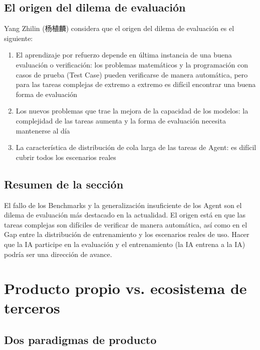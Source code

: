 \documentclass[a4paper]{article}
\begin{document}
\subsection{El origen del dilema de evaluación}

Yang Zhilin (杨植麟) considera que el origen del dilema de evaluación es el siguiente:

\begin{enumerate}
    \item El aprendizaje por refuerzo depende en última instancia de una buena evaluación o verificación: los problemas matemáticos y la programación con casos de prueba (Test Case) pueden verificarse de manera automática, pero para las tareas complejas de extremo a extremo es difícil encontrar una buena forma de evaluación
    \item Los nuevos problemas que trae la mejora de la capacidad de los modelos: la complejidad de las tareas aumenta y la forma de evaluación necesita mantenerse al día
    \item La característica de distribución de cola larga de las tareas de Agent: es difícil cubrir todos los escenarios reales
\end{enumerate}

\subsection{Resumen de la sección}

El fallo de los Benchmarks y la generalización insuficiente de los Agent son el dilema de evaluación más destacado en la actualidad. El origen está en que las tareas complejas son difíciles de verificar de manera automática, así como en el Gap entre la distribución de entrenamiento y los escenarios reales de uso. Hacer que la IA participe en la evaluación y el entrenamiento (la IA entrena a la IA) podría ser una dirección de avance.

\section{Producto propio vs. ecosistema de terceros}

\subsection{Dos paradigmas de producto}
\end{document}
